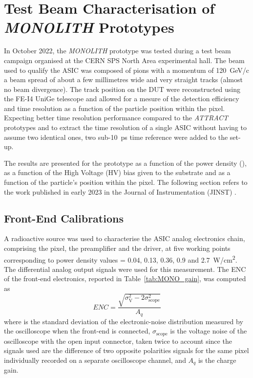 		
		
		
		
		
		
		
		
		
		
		
		
		
		
		
		
	\clearpage
	\section{Test Beam Characterisation of \textit{MONOLITH} Prototypes}
	In October 2022, the \textit{MONOLITH} prototype was tested during a test beam campaign organised at the CERN SPS North Area experimental hall. The beam used to qualify the ASIC was composed of pions with a momentum of \SI{120}{\giga\electronvolt}/c a beam spread of about a few millimetres wide and very straight tracks (almost no beam divergence). The track position on the DUT were reconstructed using the FE-I4 UniGe telescope \cite{telescope} and allowed for a mesure of the detection efficiency and time resolution as a function of the particle position within the pixel. Expecting better time resolution performance compared to the \textit{ATTRACT} prototypes and to extract the time resolution of a single ASIC without having to assume two identical ones, two sub-\SI{10}{\pico\second} time reference were added to the set-up.  
		
	The results are presented for the prototype as a function of the power density (\power), as a function of the High Voltage (HV) bias given to the substrate and as a function of the particle's position within the pixel. The following section refers to the work published in early 2023 in the Journal of Instrumentation (JINST) \cite{MONOLITH_proto2_20ps}.
		
		\subsection{Front-End Calibrations}
		A radioactive \Fe source was used to characterise the ASIC analog electronics chain, comprising the pixel, the preamplifier and the driver, at five working points corresponding to power density values \power = 0.04, 0.13, 0.36, 0.9 and \SI{2.7}{\watt/\centi\meter^2}. The differential analog output signals were used for this measurement.
		The ENC of the front-end electronics, reported in Table~\ref{tab:MONO_gain}, was computed as 
		\begin{equation}
			ENC = \frac{\sqrt{\sigma_{\text{V}}^2 -2\sigma_{\text{scope}}^2}}{A_q}
		\end{equation}
		where \noise is the standard deviation of the electronic-noise distribution measured by the oscilloscope when the front-end is connected, $\sigma_{\text{scope}}$ is the voltage noise of the oscilloscope with the open input connector, taken twice to account since the signals used are the difference of two opposite polarities signals for the same pixel individually recorded on a separate oscilloscope channel, and $A_q$ is the charge gain.
		
